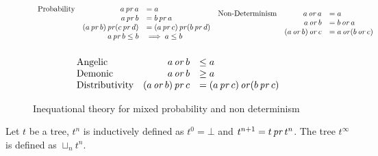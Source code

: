 \begin{figure}[h!]
    \begin{equation*}
        \begin{array}{lrl}
            \text{Probability} & a \operatorname{\mathit{pr}} a &= a \\
                        & a \operatorname{\mathit{pr}} b &= b \operatorname{\mathit{pr}} a \\
                        & (a \operatorname{\mathit{pr}} b) \operatorname{\mathit{pr}} (c \operatorname{\mathit{pr}} d) &= (a \operatorname{\mathit{pr}} c) \operatorname{\mathit{pr}} (b \operatorname{\mathit{pr}} d) \\
                        & a \operatorname{\mathit{pr}} b \leq b &\implies a \leq b  \\
            \\
        \end{array}
        \begin{array}{lrl}
            \text{Non-Determinism} & a \operatorname{\mathit{or}} a &= a \\
                        & a \operatorname{\mathit{or}} b &= b \operatorname{\mathit{or}} a \\
                        & (a \operatorname{\mathit{or}} b) \operatorname{\mathit{or}} c &= a \operatorname{\mathit{or}} (b \operatorname{\mathit{or}} c) \\
            \\
        \end{array}
    \end{equation*}
    \begin{equation*}
        \begin{array}{lrl}

            \text{Angelic} & a \operatorname{\mathit{or}} b &\leq a \\ 
            \text{Demonic} & a \operatorname{\mathit{or}} b &\geq a \\ 
            \text{Distributivity}
            & (a \operatorname{\mathit{or}} b) \operatorname{\mathit{pr}} c &= (a \operatorname{\mathit{pr}} c) \operatorname{\mathit{or}} (b \operatorname{\mathit{pr}} c)
        \end{array}
    \end{equation*}
    \caption{Inequational theory for mixed probability and non
    determinism}
    \label{fig:axiomsmixed}
\end{figure}





\begin{definition}
    Let $t$ be a tree, $t^n$ is inductively defined as 
    $t^0 = \bot$ and $t^{n+1} = t \operatorname{\mathit{pr}} t^n$. The
    tree $t^\infty$ is defined as $\sqcup_n t^n$.
\end{definition}

